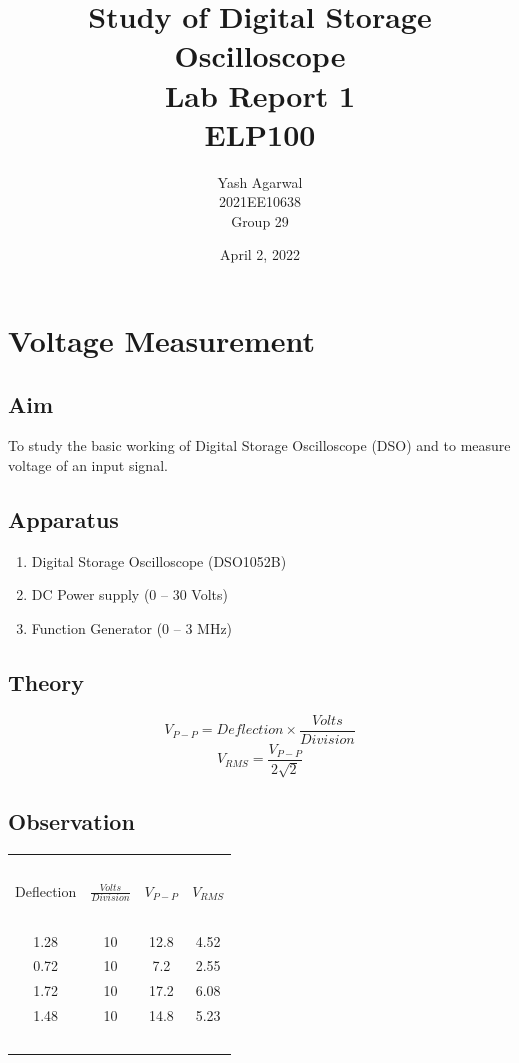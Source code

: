 \documentclass{article}
\title{Study of Digital Storage Oscilloscope \\ Lab Report 1 \\ ELP100}
\author{Yash Agarwal \\ 2021EE10638 \\ Group 29}
\date{April 2, 2022}
\begin{document}
\pagecolor{yellow!15}
\maketitle
\vfill
\tableofcontents
{}
\newpage
\section{Voltage Measurement}
\vspace{10px}
\subsection{Aim}
To study the basic working of Digital Storage Oscilloscope (DSO) and to measure voltage of an input signal.
\vspace{10px}
\subsection{Apparatus}
\begin{enumerate}
    \item Digital Storage Oscilloscope (DSO1052B)
    \item DC Power supply (0 – 30 Volts)
    \item Function Generator (0 – 3 MHz)
\end{enumerate}
\vspace{10px}
\subsection{Theory}
\begin{equation}
    V_{P-P}= Deflection \times \frac{Volts}{Division}
\end{equation}
\begin{equation}
    V_{RMS}= \frac{V_{P-P}}{2 \sqrt{2}}
\end{equation}
\vspace{10px}
\subsection{Observation}
\vspace{10px}
\begin{center}
\begin{tabular}{|c | c | c | c|} 
 \hline
    \ & \ & \ & \ \\
    Deflection & $ \frac{Volts}{Division} $ & $ V_{P-P} $ & $ V_{RMS} $ \\ [1em]
    \hline
    \ & \ & \ & \ \\
    1.28 & 10 & 12.8 & 4.52 \\
    0.72 & 10 & 7.2 & 2.55 \\
    1.72 & 10 & 17.2 & 6.08 \\
    1.48 & 10 & 14.8 & 5.23 \\
    \ & \ & \ & \ \\
 \hline
\end{tabular}
\end{center}
\vspace{10px}
\end{document}
